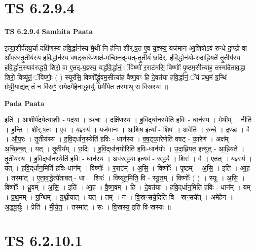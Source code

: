 \documentclass[17pt]{extarticle}
\begin{document}
\section{ TS 6.2.9.4 }

\textbf{TS 6.2.9.4 } \newline
\textbf{Samhita Paata} \newline

इत्या॒शीर्प॑दय॒र्चा दक्षि॑णस्य हवि॒र्द्धान॑स्य मे॒थीं नि ह॑न्ति शीर्.ष॒त ए॒व य॒ज्ञ्स्य॒ यज॑मान आ॒शिषोऽव॑ रुन्धे द॒ण्डो वा औ॑प॒रस्तृ॒तीय॑स्य हवि॒र्द्धान॑स्य वषट्का॒रे-णाक्ष॑-मच्छिन॒द्-यत्-तृ॒तीयं॑ छ॒दिर्. ह॑वि॒र्द्धान॑यो-रुदाह्रि॒यते॑ तृ॒तीय॑स्य हवि॒र्द्धान॒स्याव॑रुद्ध्यै॒ शिरो॒ वा ए॒तद्-य॒ज्ञ्स्य॒ यद्ध॑वि॒र्द्धानं॒ ॅविष्णो॑ र॒राट॑मसि॒ विष्णोः᳚ पृ॒ष्ठम॒सीत्या॑ह॒ तस्मा॑देताव॒द्धा शिरो॒ विष्यू॑तं॒ ॅविष्णोः॒ ( ) स्यूर॑सि॒ विष्णो᳚र्द्ध्रु॒वम॒सीत्या॑ह वैष्ण॒वꣳ हि दे॒वत॑या हवि॒र्द्धानं॒ ॅयं प्र॑थ॒मं ग्र॒न्थिं ग्र॑थ्नी॒याद्यत् तं न वि॑स्रꣳ॒॒ सये॒दमे॑हेनाद्ध्व॒र्युः प्रमी॑येत॒ तस्मा॒थ् स वि॒स्रस्यः॑ ॥ \newline

\textbf{Pada Paata} \newline

इति॑ । आ॒शीर्प॑द॒येत्या॒शीः - प॒द॒या॒ । ऋ॒चा । दक्षि॑णस्य । ह॒वि॒द्‌र्धान॒स्येति॑ हविः - धान॑स्य । मे॒थीम् । नीति॑ । ह॒न्ति॒ । शी॒र्॒.ष॒तः । ए॒व । य॒ज्ञ्स्य॑ । यज॑मानः । आ॒शिष॒ इत्या᳚ - शिषः॑ । अवेति॑ । रु॒न्धे॒ । द॒ण्डः । वै । औ॒प॒रः । तृ॒तीय॑स्य । ह॒वि॒द्‌र्धान॒स्येति॑ हविः - धान॑स्य । व॒ष॒ट्का॒रेणेति॑ वषट् - का॒रेण॑ । अक्ष᳚म् । अ॒च्छि॒न॒त् । यत् । तृ॒तीय᳚म् । छ॒दिः । ह॒वि॒द्‌र्धान॒योरिति॑ हविः-धान॑योः । उ॒दा॒ह्रि॒यत॒ इत्यु॑त् - आ॒ह्रि॒यते᳚ । तृ॒तीय॑स्य । ह॒वि॒द्‌र्धान॒स्येति॑ हविः - धान॑स्य । अव॑रुद्ध्या॒ इत्यव॑ - रु॒द्ध्यै॒ । शिरः॑ । वै । ए॒तत् । य॒ज्ञ्स्य॑ । यत् । ह॒वि॒द्‌र्धान॒मिति॑ हविः-धान᳚म् । विष्णोः᳚ । र॒राट᳚म् । अ॒सि॒ । विष्णोः᳚ । पृ॒ष्ठम् । अ॒सि॒ । इति॑ । आ॒ह॒ । तस्मा᳚त् । ए॒ता॒व॒द्धेत्ये॑तावत् - धा । शिरः॑ । विष्यू॑त॒मिति॒ वि - स्यू॒त॒म् । विष्णोः᳚ ( ) । स्यूः । अ॒सि॒ । विष्णोः᳚ । ध्रु॒वम् । अ॒सि॒ । इति॑ । आ॒ह॒ । वै॒ष्ण॒वम् । हि । दे॒वत॑या । ह॒वि॒द्‌र्धान॒मिति॑ हविः - धान᳚म् । यम् । प्र॒थ॒मम् । ग्र॒न्थिम् । ग्र॒थ्नी॒यात् । यत् । तम् । न । वि॒स्रꣳ॒॒सये॒दिति॑ वि - स्रꣳ॒॒सये᳚त् । अमे॑हेन । अ॒द्ध्व॒र्युः । प्रेति॑ । मी॒ये॒त॒ । तस्मा᳚त् । सः । वि॒स्रस्य॒ इति॑ वि-स्रस्यः॑ ॥  \newline





\section{ TS 6.2.10.1 }
\end{document}
